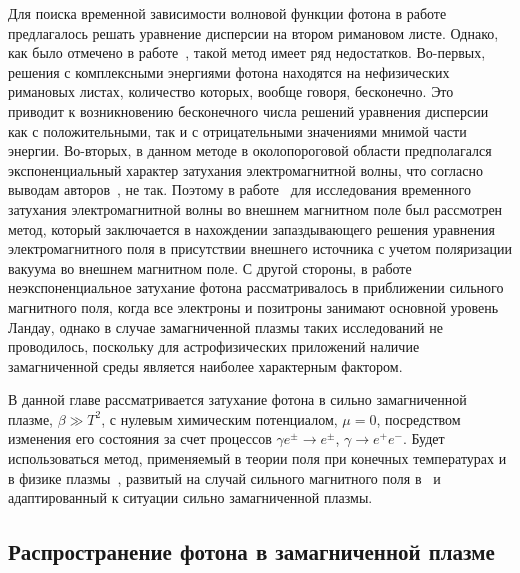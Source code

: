 Для поиска временной зависимости волновой функции фотона в 
работе~\cite{Shabad:1988} предлагалось решать уравнение дисперсии на втором 
римановом листе. Однако, как было отмечено в работе~\cite{MikhChist:2001}, 
такой метод имеет ряд недостатков. Во-первых, решения с комплексными энергиями 
фотона находятся на нефизических римановых листах, количество которых, вообще 
говоря, бесконечно. Это приводит к возникновению бесконечного числа решений 
уравнения дисперсии как с положительными, так и с отрицательными значениями 
мнимой части энергии. Во-вторых, в данном методе в околопороговой области 
предполагался экспоненциальный характер затухания электромагнитной волны, что 
согласно выводам авторов~\cite{MikhChist:2001}, не так. Поэтому 
в работе~\cite{MikhChist:2001} для исследования временного затухания 
электромагнитной волны во внешнем магнитном поле был рассмотрен метод, который 
заключается в нахождении запаздывающего решения уравнения электромагнитного 
поля в присутствии внешнего источника с учетом поляризации вакуума во внешнем 
магнитном поле. С другой стороны, в работе~\cite{MikhChist:2001} 
неэкспоненциальное затухание фотона рассматривалось в приближении сильного 
магнитного поля, когда все электроны и позитроны занимают основной уровень 
Ландау, однако в случае замагниченной плазмы таких исследований не проводилось, 
поскольку для астрофизических приложений наличие замагниченной среды является 
наиболее характерным фактором.



В данной главе рассматривается затухание фотона в сильно замагниченной плазме, 
$\beta 
\gg T^2$,
 с нулевым химическим потенциалом, $\mu = 0$, посредством изменения его 
 состояния 
за счет процессов $\gamma e^\pm\to e^\pm$, $\gamma \to e^+e^-$. Будет 
использоваться метод, применяемый в теории поля при конечных температурах и в 
физике плазмы~\cite{Boyan}, развитый на случай сильного магнитного поля 
в~\cite{MikhChist:2001} и адаптированный к ситуации сильно замагниченной плазмы.

\subsection{Распространение фотона в замагниченной плазме}

